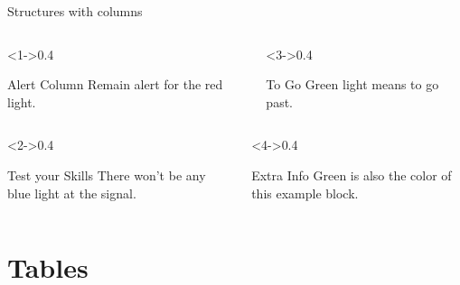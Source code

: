 \documentclass{beamer}
\begin{document}
\begin{frame}{Structures with columns}
\begin{columns}
    \begin{column}<1->{0.4\textwidth}
      \begin{alertblock}{Alert Column}
Remain alert for the red
light.
       \end{alertblock}  
    \end{column}
    \begin{column}<3->{0.4\textwidth}
     \begin{exampleblock}{To Go}
  Green light means to go
past.  
\end{exampleblock}  
    \end{column}
\end{columns}
\begin{columns}
    \begin{column}<2->{0.4\textwidth}
     
      \begin{block}{Test your Skills}
There won’t be any blue
light at the signal.
      \end{block}
    \end{column}
    \begin{column}<4->{0.4\textwidth}
     \begin{exampleblock}{Extra Info}
  Green is also the color of
this example block.
\end{exampleblock}    
    \end{column}
\end{columns}
\end{frame}

\section{Tables}
\end{document}
